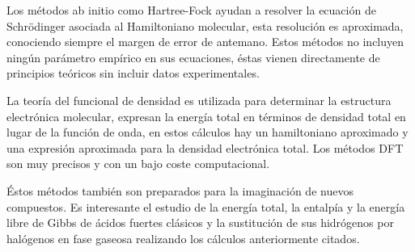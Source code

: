 Los métodos ab initio como Hartree-Fock ayudan a resolver la ecuación de Schrödinger asociada al Hamiltoniano molecular, esta resolución es aproximada, conociendo siempre el margen de error de antemano. Estos métodos no incluyen ningún parámetro empírico en sus ecuaciones, éstas vienen directamente de principios teóricos sin incluir datos experimentales.

La teoría del funcional de densidad es utilizada para determinar la estructura electrónica molecular, expresan la energía total en términos de densidad total en lugar de la función de onda, en estos cálculos hay un hamiltoniano aproximado y una expresión aproximada para la densidad electrónica total. Los métodos DFT son muy precisos y con un bajo coste computacional.

Éstos métodos también son preparados para la imaginación de nuevos compuestos. Es interesante el estudio de la energía total, la entalpía y la energía libre de Gibbs de ácidos fuertes clásicos y la sustitución de sus hidrógenos por halógenos en fase gaseosa \cite{quimica3} realizando los cálculos anteriormente citados.